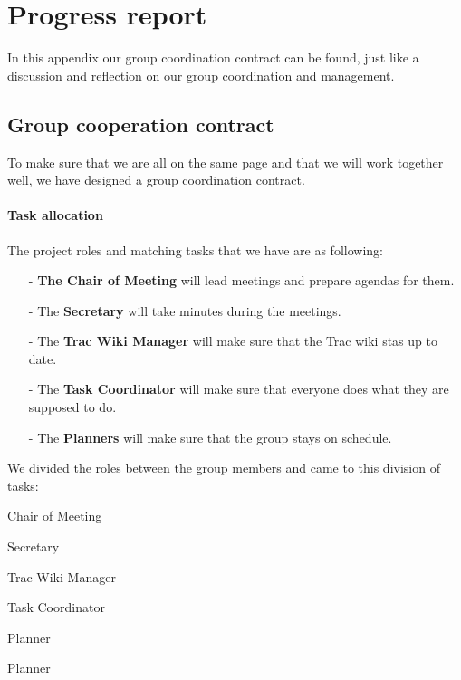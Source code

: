 \chapter{Progress report}

In this appendix our group coordination contract can be found, just like a discussion and reflection on our group coordination and management.

\section*{Group cooperation contract}

To make sure that we are all on the same page and that we will work together well, we have designed a group coordination contract.
\subsubsection{Task allocation}
The project roles and matching tasks that we have are as following:
\begin{itemize}
\item[-] \textbf{The Chair of Meeting} will lead meetings and prepare agendas for them.
\item[-] The \textbf{Secretary} will take minutes during the meetings.
\item[-] The \textbf{Trac Wiki Manager} will make sure that the Trac wiki stas up to date.
\item[-] The \textbf{Task Coordinator} will make sure that everyone does what they are supposed to do.
\item[-] The \textbf{Planners} will make sure that the group stays on schedule.
\end{itemize}

We divided the roles between the group members and came to this division of tasks:

\begin{description}[noitemsep]
\item[Lisette] Chair of Meeting
\item[Ashay] Secretary
\item[Joshua] Trac Wiki Manager
\item[Jelle] Task Coordinator
\item[Gavin] Planner
\item[Youp] Planner
\end{description}

